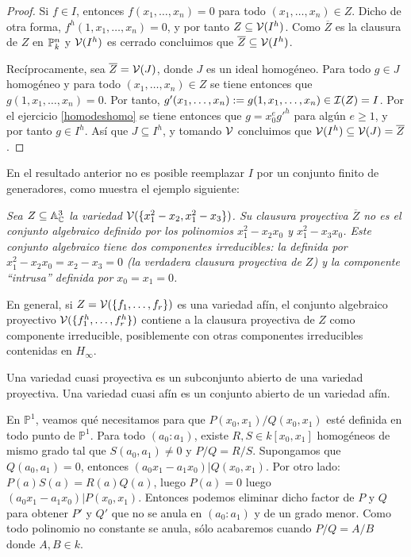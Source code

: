 \documentclass[ACGA.tex]{subfiles}
\begin{document}
\begin{proof}
 Si $f\in I$, entonces $f(x_1,\ldots,x_n)=0$ para todo $(x_1,\ldots,x_n)\in Z$. Dicho de otra forma, $f^h(1,x_1,\ldots,x_n)=0$, y por tanto $Z\subseteq\mathcal{V}(I^h)$. Como $\overline Z$ es la clausura de $Z$ en $\mathbb{P}^n_k$ y $\mathcal{V}(I^h)$ es cerrado concluimos que $\overline Z\subseteq\mathcal{V}(I^h)$. 

Recíprocamente, sea $\overline Z=\mathcal{V}(J)$, donde $J$ es un ideal homogéneo. Para todo $g\in J$ homogéneo y para todo $(x_1,\ldots,x_n)\in Z$ se tiene entonces que $g(1,x_1,\ldots,x_n)=0$. Por tanto, $g'(x_1,\ldots,x_n):=g(1,x_1,\ldots,x_n)\in\mathcal{I}(Z)=I$. Por el ejercicio \ref{homodeshomo} se tiene entonces que $g=x_0^eg'^h$ para algún $e\geq 1$, y por tanto $g\in I^h$. Así que $J\subseteq I^h$, y tomando $\mathcal{V}$ concluimos que $\mathcal{V}(I^h)\subseteq\mathcal{V}(J)=\overline Z$.
\end{proof}

En el resultado anterior no es posible reemplazar $I$ por un conjunto finito de generadores, como muestra el ejemplo siguiente:

\begin{ejs}
 \emph{Sea $Z\subseteq\mathbb{A}^3_{\mathbb{C}}$ la variedad $\mathcal{V}(\{x_1^2-x_2,x_1^2-x_3\})$. Su clausura proyectiva $\overline Z$ {\it no es} el conjunto algebraico definido por los polinomios $x_1^2-x_2x_0$ y $x_1^2-x_3x_0$. Este conjunto algebraico tiene dos componentes irreducibles: la definida por $x_1^2-x_2x_0=x_2-x_3=0$ (la verdadera clausura proyectiva de $Z$) y la componente ``intrusa'' definida por $x_0=x_1=0$.}
\end{ejs}

En general, si $Z=\mathcal{V}(\{f_1,\ldots,f_r\})$ es una variedad afín, el conjunto algebraico proyectivo $\mathcal{V}(\{f_1^h,\ldots,f_r^h\})$ contiene a la clausura proyectiva de $Z$ como componente irreducible, posiblemente con otras componentes irreducibles contenidas en $H_\infty$.













\begin{defi} Una variedad cuasi proyectiva es un subconjunto abierto de una variedad proyectiva. Una variedad cuasi afín es un conjunto abierto de un variedad afín.
\end{defi}

\begin{ej}
En $\mathbb{P}^1$, veamos qué necesitamos para que $P(x_0,x_1)/Q(x_0,x_1)$ esté definida en todo punto de $\mathbb{P}^1$. Para todo $(a_0:a_1)$, existe $R,S \in k[x_0,x_1]$ homogéneos de mismo grado tal que $S(a_0,a_1)\neq 0$ y $P/Q=R/S$. Supongamos que $Q(a_0,a_1)=0$, entonces $(a_0x_1-a_1x_0) | Q(x_0,x_1)$. Por otro lado: $P(a)S(a)=R(a)Q(a)$, luego $P(a)=0$ luego $(a_0x_1-a_1x_0) | P(x_0,x_1)$. Entonces podemos eliminar dicho factor de $P$ y $Q$ para obtener $P'$ y $Q'$ que no se anula en $(a_0:a_1)$ y de un grado menor. Como todo polinomio no constante se anula, sólo acabaremos cuando $P/Q=A/B$ donde $A,B \in k$. 
\end{ej}
\end{document}
